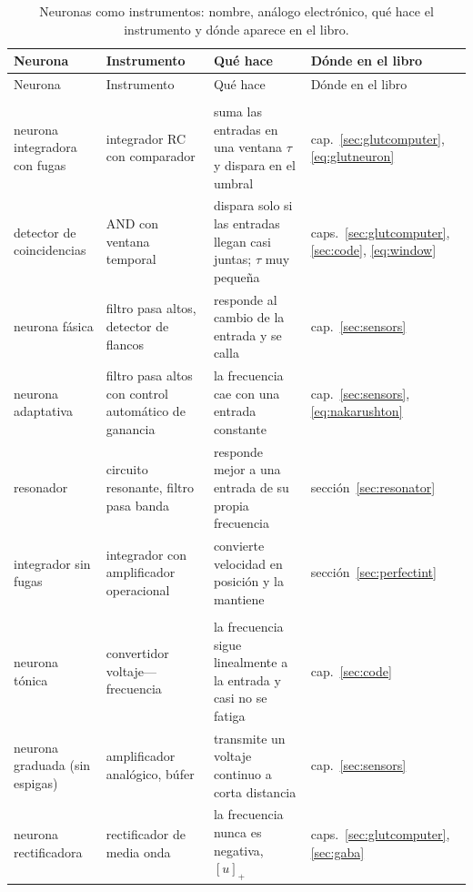 \begin{center}
\footnotesize
\setlength{\tabcolsep}{3pt}
\renewcommand{\arraystretch}{1.15}
\begin{longtable}{>{\raggedright}p{3.1cm}>{\raggedright}p{3.3cm}>{\raggedright}p{4.7cm}>{\raggedright\arraybackslash}p{2.4cm}}
\caption{Neuronas como instrumentos: nombre, análogo electrónico, qué hace el instrumento y dónde aparece en el libro.}\label{tab:eetypes}\\
\toprule
Neurona & Instrumento & Qué hace & Dónde en el libro \\
\midrule
\endfirsthead
\toprule
Neurona & Instrumento & Qué hace & Dónde en el libro \\
\midrule
\endhead
\bottomrule
\endfoot
\multicolumn{4}{l}{\emph{Filtros e integradores}} \\
neurona integradora con fugas & integrador RC con comparador & suma las entradas en una ventana $\tau$ y dispara en el umbral & cap.~\ref{sec:glutcomputer}, \eqref{eq:glutneuron} \\
detector de coincidencias & AND con ventana temporal & dispara solo si las entradas llegan casi juntas; $\tau$ muy pequeña & caps.~\ref{sec:glutcomputer}, \ref{sec:code}, \eqref{eq:window} \\
neurona fásica & filtro pasa altos, detector de flancos & responde al cambio de la entrada y se calla & cap.~\ref{sec:sensors} \\
neurona adaptativa & filtro pasa altos con control automático de ganancia & la frecuencia cae con una entrada constante & cap.~\ref{sec:sensors}, \eqref{eq:nakarushton} \\
resonador & circuito resonante, filtro pasa banda & responde mejor a una entrada de su propia frecuencia & sección~\ref{sec:resonator} \\
integrador sin fugas & integrador con amplificador operacional & convierte velocidad en posición y la mantiene & sección~\ref{sec:perfectint} \\
\midrule
\multicolumn{4}{l}{\emph{Convertidores}} \\
neurona tónica & convertidor voltaje---frecuencia & la frecuencia sigue linealmente a la entrada y casi no se fatiga & cap.~\ref{sec:code} \\
neurona graduada (sin espigas) & amplificador analógico, búfer & transmite un voltaje continuo a corta distancia & cap.~\ref{sec:sensors} \\
neurona rectificadora & rectificador de media onda & la frecuencia nunca es negativa, $[u]_+$ & caps.~\ref{sec:glutcomputer}, \ref{sec:gaba} \\

\end{longtable}
\end{center}

